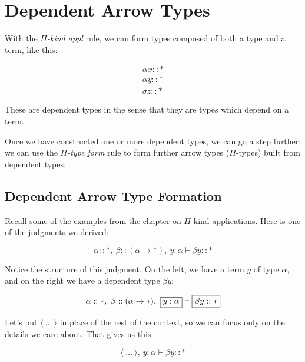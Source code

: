 \documentclass{book}
\numberwithin{equation}{chapter}
\begin{document}
\chapter{Dependent Arrow Types}

With the \textit{$\Pi$-kind appl} rule, we can form types composed of both a type and a term, like this:

\begin{align}
\alpha x :: \ast \\
\alpha y :: \ast \\
\sigma z :: \ast
\end{align}

\noindent
These are dependent types in the sense that they are types which depend on a term.

Once we have constructed one or more dependent types, we can go a step further: we can use the \textit{$\Pi$-type form} rule to form further arrow types ($\Pi$-types) built from dependent types.


\section{Dependent Arrow Type Formation}

Recall some of the examples from the chapter on $\Pi$-kind applications. Here is one of the judgments we derived:

\begin{equation}
\alpha :: \ast,~\beta :: (\alpha \rightarrow \ast),~y : \alpha \vdash \beta y :: \ast
\end{equation}

\noindent
Notice the structure of this judgment. On the left, we have a term $y$ of type $\alpha$, and on the right we have a dependent type $\beta y$:

\begin{equation}
\alpha :: \ast,~\beta :: (\alpha \rightarrow \ast),~\framebox{$y : \alpha$} \vdash \framebox{$\beta y :: \ast$}
\end{equation}

\noindent
Let's put $\langle~\ldots~\rangle$ in place of the rest of the context, so we can focus only on the details we care about. That gives us this:

\begin{equation}
\langle~\ldots~\rangle,~y : \alpha \vdash \beta y :: \ast
\end{equation}
\end{document}
